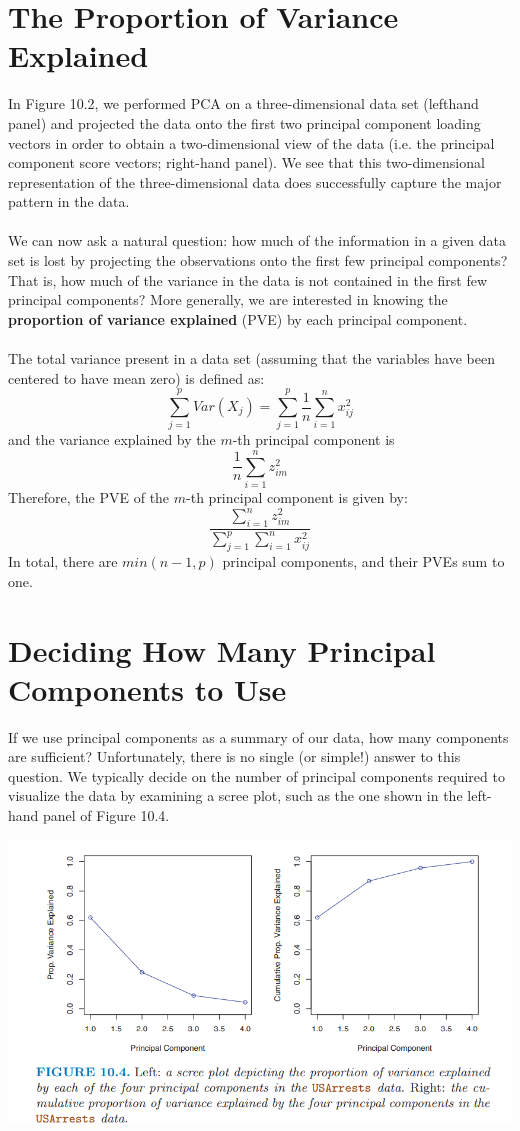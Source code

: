 \section{The Proportion of Variance Explained}
In Figure 10.2, we performed PCA on a three-dimensional data set (lefthand panel) and projected the data onto the first two principal component loading vectors in order to obtain a two-dimensional view of the data  (i.e. the principal component score vectors; right-hand panel). We see that this two-dimensional representation of the three-dimensional data does successfully capture the major pattern in the data.\\\\
We can now ask a natural question: how much of the information in a given data set is lost by projecting the observations onto the first few principal components? That is, how much of the variance in the data is not contained in the first few principal components? More generally, we are interested in knowing the \textbf{proportion of variance explained} (PVE) by each principal component.\\\\
The total variance present in a data set (assuming that the variables have been centered to have mean zero) is defined as:
\[\sum_{j=1}^p Var(X_j) = \sum_{j=1}^p \frac{1}{n} \sum_{i=1}^n x_{ij}^2\]
and the variance explained by the $m$-th principal component is
\[\frac{1}{n}\sum_{i=1}^n z_{im}^2\]
Therefore, the PVE of the $m$-th principal component is given by:
\[\frac{\sum_{i=1}^n z_{im}^2}{\sum_{j=1}^p\sum_{i=1}^n x_{ij}^2}\]
In total, there are $min(n - 1, p)$ principal components, and their PVEs sum to one.

\section{Deciding How Many Principal Components to Use}
If we use principal components as a summary of our data, how many components are sufficient?  Unfortunately, there is no single (or simple!) answer to this question. We typically decide on the number of principal components required to visualize the data by examining a scree plot, such as the one shown in the left-hand panel of Figure 10.4.
\begin{center}
    \includegraphics[scale=0.8]{images/scree plot.png}
\end{center}
